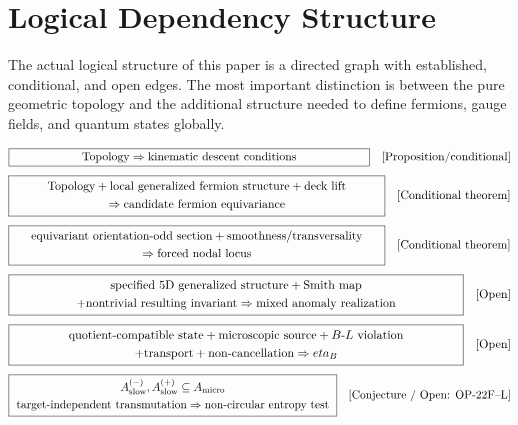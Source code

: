 \documentclass[11pt]{article}
\theoremstyle{canonmath}
\theoremstyle{canonpostulate}
\theoremstyle{canonclaim}
\def\mathcal#1{#1}%
\def\eta{eta}%
\begin{document}

\newpage
\section*{Logical Dependency Structure}
The actual logical structure of this paper is a directed graph with established, conditional, and open edges. The most important distinction is between the pure geometric topology and the additional structure needed to define fermions, gauge fields, and quantum states globally.

\begin{equation*}
\boxed{\makebox[10.5cm][c]{$\text{Topology} \Rightarrow \text{kinematic descent conditions}$}}
\quad [\text{Proposition/conditional}]
\end{equation*}
\begin{equation*}
\boxed{\makebox[10.9cm][c]{$\begin{gathered}
\text{Topology} + \text{local generalized fermion structure} + \text{deck lift} \\
\Rightarrow \text{candidate fermion equivariance}
\end{gathered}$}}
\quad [\text{Conditional theorem}]
\end{equation*}
\begin{equation*}
\boxed{\makebox[10.9cm][c]{$\begin{gathered}
\text{equivariant orientation-odd section} + \text{smoothness/transversality} \\
\Rightarrow \text{forced nodal locus}
\end{gathered}$}}
\quad [\text{Conditional theorem}]
\end{equation*}
\begin{equation*}
\boxed{\makebox[13cm][c]{$\begin{gathered}
\text{specified 5D generalized structure} + \text{Smith map} \\
+ \text{nontrivial resulting invariant} \Rightarrow \text{mixed anomaly realization}
\end{gathered}$}}
\quad [\text{Open}]
\end{equation*}
\begin{equation*}
\boxed{\makebox[13cm][c]{$\begin{gathered}
\text{quotient-compatible state} + \text{microscopic source} + B\text{-}L \text{ violation} \\
+ \text{transport} + \text{non-cancellation} \Rightarrow \eta_B
\end{gathered}$}}
\quad [\text{Open}]
\end{equation*}
\begin{equation*}
\boxed{\makebox[9.8cm][c]{$\begin{gathered}
\mathcal A_{\rm slow}^{(-)},\mathcal A_{\rm slow}^{(+)}\subseteq\mathcal A_{\rm micro} \\
\text{target-independent transmutation}\Rightarrow\text{non-circular entropy test}
\end{gathered}$}}
\quad [\text{Conjecture / Open: OP-22F--L}]
\end{equation*}
\end{document}
